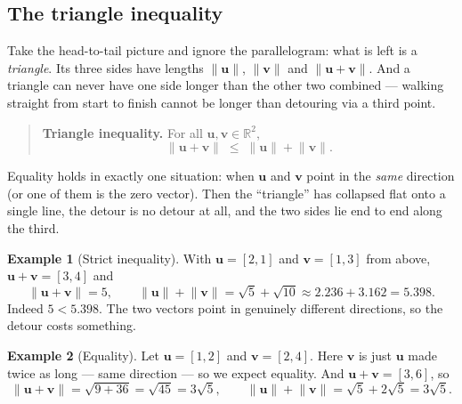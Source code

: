 \documentclass[11pt]{article}
\theoremstyle{definition}
\newtheorem{ex}{Example}[section]
\theoremstyle{remark}
\newcommand{\R}{\mathbb{R}}
\newcommand{\vc}[1]{\mathbf{#1}}
\newcommand{\norm}[1]{\lVert #1\rVert}
\newcommand{\lattice}[4]{%
  \draw[step=1cm,gray!25,very thin] (#1,#3) grid (#2,#4);
  \draw[axisline] (#1,0) -- (#2+0.45,0) node[right,font=\scriptsize,black]{$x$};
  \draw[axisline] (0,#3) -- (0,#4+0.45) node[above,font=\scriptsize,black]{$y$};
}
\begin{document}
\subsection{The triangle inequality}
Take the head-to-tail picture and ignore the parallelogram: what is left is a
\emph{triangle}. Its three sides have lengths $\norm{\vc{u}}$, $\norm{\vc{v}}$
and $\norm{\vc{u}+\vc{v}}$. And a triangle can never have one side longer than
the other two combined --- walking straight from start to finish cannot be
longer than detouring via a third point.

\begin{quote}
\textbf{Triangle inequality.} For all $\vc{u},\vc{v}\in\R^{2}$,
\[
  \norm{\vc{u}+\vc{v}} \;\le\; \norm{\vc{u}}+\norm{\vc{v}}.
\]
\end{quote}

\noindent Equality holds in exactly one situation: when $\vc{u}$ and $\vc{v}$
point in the \emph{same} direction (or one of them is the zero vector). Then the
``triangle'' has collapsed flat onto a single line, the detour is no detour at
all, and the two sides lie end to end along the third.

\begin{ex}[Strict inequality]
With $\vc{u}=[2,1]$ and $\vc{v}=[1,3]$ from above, $\vc{u}+\vc{v}=[3,4]$ and
\[
  \norm{\vc{u}+\vc{v}}=5,
  \qquad
  \norm{\vc{u}}+\norm{\vc{v}}=\sqrt5+\sqrt{10}\approx 2.236+3.162=5.398 .
\]
Indeed $5<5.398$. The two vectors point in genuinely different directions, so
the detour costs something.
\end{ex}

\begin{ex}[Equality]
Let $\vc{u}=[1,2]$ and $\vc{v}=[2,4]$. Here $\vc{v}$ is just $\vc{u}$ made
twice as long --- same direction --- so we expect equality. And
$\vc{u}+\vc{v}=[3,6]$, so
\[
  \norm{\vc{u}+\vc{v}}=\sqrt{9+36}=\sqrt{45}=3\sqrt5,
  \qquad
  \norm{\vc{u}}+\norm{\vc{v}}=\sqrt5+2\sqrt5=3\sqrt5 .
\]
\end{ex}

\begin{center}
\end{center}
\end{document}
